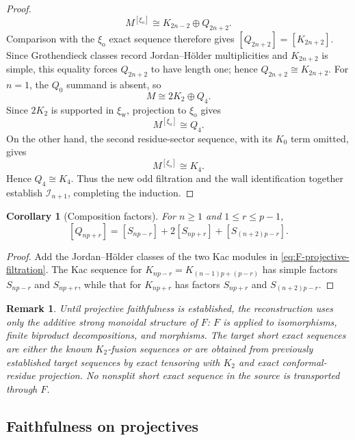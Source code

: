 \documentclass[12pt,leqno]{amsart}
\numberwithin{equation}{section}
\newtheorem{cor}[thm]{Corollary}
\newtheorem{rmk}[thm]{Remark}
\begin{document}
\begin{proof}
\[
 M^{[\xi_{\mathrm o}]}
 \cong K_{2n-2}\oplus Q_{2n+2}.
\]
Comparison with the $\xi_{\mathrm o}$ exact sequence therefore gives
$[Q_{2n+2}]=[K_{2n+2}]$.  Since Grothendieck classes record
Jordan--H\"older multiplicities and $K_{2n+2}$ is simple, this equality
forces $Q_{2n+2}$ to have length one; hence
$Q_{2n+2}\cong K_{2n+2}$.  For $n=1$, the $Q_0$ summand is absent, so
\[
 M\cong2K_2\oplus Q_4.
\]
Since $2K_2$ is supported in $\xi_{\mathrm w}$, projection to
$\xi_{\mathrm o}$ gives
\[
 M^{[\xi_{\mathrm o}]}\cong Q_4.
\]
On the other hand, the second residue-sector sequence, with its $K_0$
term omitted, gives
\[
 M^{[\xi_{\mathrm o}]}\cong K_4.
\]
Hence $Q_4\cong K_4$.  Thus the new odd filtration and the wall identification together establish
$\mathcal I_{n+1}$, completing the induction.

\end{proof}

\begin{cor}[Composition factors]\label{cor:Q-composition-factors}
For $n\ge1$ and $1\le r\le p-1$,
\begin{equation}\label{eq:Q-global-JH}
 [Q_{np+r}]
 =[S_{np-r}]+2[S_{np+r}]+[S_{(n+2)p-r}].
\end{equation}
\end{cor}

\begin{proof}
Add the Jordan--H\"older classes of the two Kac modules in
\eqref{eq:F-projective-filtration}.  The Kac sequence for
$K_{np-r}=K_{(n-1)p+(p-r)}$ has simple factors
$S_{np-r}$ and $S_{np+r}$, while that for $K_{np+r}$ has factors
$S_{np+r}$ and $S_{(n+2)p-r}$.
\end{proof}

\begin{rmk}\label{rmk:no-left-exactness}
Until projective faithfulness is established, the reconstruction uses only
the additive strong monoidal structure of $F$: $F$ is applied to
isomorphisms, finite biproduct decompositions, and morphisms.  The target
short exact sequences are either the known $K_2$-fusion sequences or are
obtained from previously established target sequences by exact tensoring
with $K_2$ and exact conformal-residue projection.  No nonsplit short exact
sequence in the source is transported through $F$.
\end{rmk}

\subsection{Faithfulness on projectives}
\end{document}
